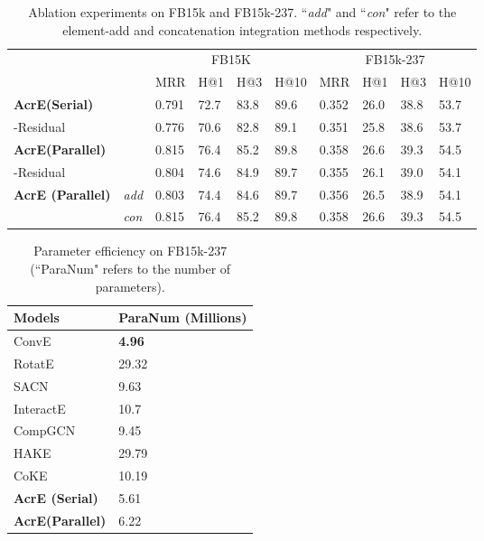 \documentclass[11pt]{article}
\begin{document}
\begin{table}[t]
	\centering
	
\begin{tabular}{llllllllll}
		\toprule
		\multicolumn{2}{r}{} & \multicolumn{4}{c}{FB15K}  & \multicolumn{4}{c}{FB15k-237} \\
		\cmidrule{2-10}
		\multicolumn{2}{r}{} &  \multicolumn{1}{l}{MRR} & \multicolumn{1}{l}{H@1} & \multicolumn{1}{l}{H@3} & \multicolumn{1}{l}{H@10} & \multicolumn{1}{l}{MRR} & \multicolumn{1}{l}{H@1} & \multicolumn{1}{l}{H@3} & \multicolumn{1}{l}{H@10} \\
		
\midrule
		\multicolumn{2}{l}{\textbf{AcrE(Serial)}} & {0.791} & {72.7} & {83.8} &{89.6} & {0.352}  & {26.0}  & {38.8}  & {53.7}  \\
		\multicolumn{2}{l}{-Residual} & 0.776 & 70.6 & 82.8 & 89.1 & 0.351& 25.8 & 38.6 & 53.7 \\
		\hline
		\multicolumn{2}{l}{\textbf{AcrE(Parallel)}} & {0.815} & {76.4} & {85.2} &{89.8} &{0.358}  & {26.6}  & {39.3}  & {54.5} \\
		\multicolumn{2}{l}{-Residual} & 0.804 & 74.6 & 84.9 & 89.7 & 0.355& 26.1 & 39.0 & 54.1 \\
		\hline

		\multirow{2}[0]{*}{\textbf{AcrE (Parallel)}}   & {\textit{add}}& {0.803} & {74.4} & {84.6} &{89.7} &{0.356}  & {26.5}  & {38.9}  & {54.1}\\
		\multicolumn{1}{l}{} & {\textit{con}} & {0.815} & {76.4} & {85.2} &{89.8} &{0.358}  & {26.6}  & {39.3}  & {54.5}  \\
		
		\hline
	\end{tabular}\caption{Ablation experiments on FB15k and FB15k-237. ``\emph{add}" and ``\emph{con}" refer to the element-add and concatenation integration methods respectively.}
	\label{tab:abl}\end{table}


\begin{table}[t]\centering
{\begin{tabular}{ll}
\hline
Models &  \multicolumn{1}{l}{ ParaNum (Millions)} \\
\hline
ConvE{\cite{Dettmers:2018}}&  {\bf4.96} \\
RotatE{\cite{Sun:2019}}  &  29.32 \\
SACN{\cite{Shang:2019}}  &  9.63 \\
InteractE{\cite{Vashishth:2020a}} & 10.7\\
CompGCN{\cite{Vashishth:2020b}}  & 9.45 \\
HAKE{\cite{Zhang:2020}}   &  29.79 \\
CoKE{\cite{Wang:2020}}   & 10.19 \\


\hline
{\bf AcrE (Serial)} & 5.61   \\
{\bf AcrE(Parallel)} & 6.22   \\
\hline
\end{tabular}}
\caption{Parameter efficiency on FB15k-237 (``ParaNum" refers to the number of parameters). }
\label{tab:paras}\end{table}
\end{document}
